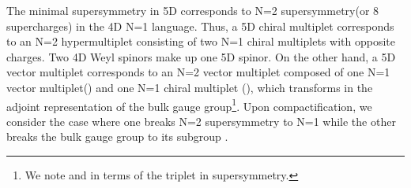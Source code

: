 \documentclass[a4paper,12pt]{article}
\begin{document}
The minimal supersymmetry in 5D
corresponds to N=2 supersymmetry(or 8 supercharges)
in the 4D N=1 language.
Thus, a 5D chiral multiplet corresponds to an N=2 hypermultiplet consisting
of two N=1 chiral multiplets with opposite charges. Two 4D Weyl spinors make
up one 5D spinor. On the other hand,
a 5D vector multiplet corresponds to an N=2 vector multiplet composed of one
N=1 vector multiplet(\coordHE{})
and one N=1 chiral multiplet
(\coordHE{}), 
which transforms in the adjoint representation of the bulk gauge 
group\footnote{We note \coordHE{} and 
\coordHE{} 
in terms of the \coordHE{} triplet \coordHE{} in \coordHE{} supersymmetry.}.
Upon compactification, we consider the case
where one \coordHE{} breaks N=2 supersymmetry to N=1
while the other \coordHE{} breaks the bulk \coordHE{} gauge group
to its subgroup \coordHE{}.
\end{document}
